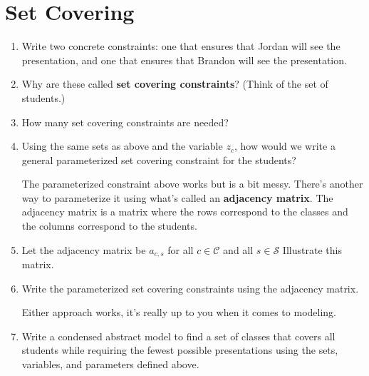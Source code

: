 \documentclass[11pt]{article}
\theoremstyle{definition}
\begin{document}
\newpage
\section{Set Covering}

\begin{enumerate}

\item Write two concrete constraints:  one that ensures that Jordan will see the presentation, and one that ensures that Brandon will see the presentation.

\vspace{3in}

\item Why are these called {\bf set covering constraints}? (Think of the set of students.) \vspace{0.5in}

\item How many set covering constraints are needed? \vspace{1in}

\item Using the same sets as above and the variable $z_c$, how would we write a general parameterized set covering constraint for the students?

\newpage

The parameterized constraint above works but is a bit messy. There's another way to parameterize it using what's called an \textbf{adjacency matrix}. The adjacency matrix is a matrix where the rows correspond to the classes and the columns correspond to the students.

\item Let the adjacency matrix be $a_{c,s}$ for all $c \in \mathscr{C}$ and all $s \in \mathscr{S}$ Illustrate this matrix. \vspace{2in}

\item Write the parameterized set covering constraints using the adjacency matrix. \vfill

\begin{tcolorbox}
Either approach works, it's really up to you when it comes to modeling.
\end{tcolorbox}



\item Write a condensed abstract model to find a set of classes that covers all students while requiring the fewest possible presentations using the sets, variables, and parameters defined above.  
\vfill
\vfill
\end{enumerate}
\end{document}
